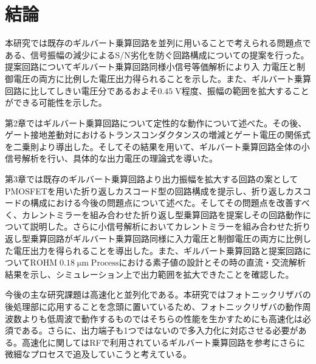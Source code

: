 \chapter{結論}

    本研究では既存のギルバート乗算回路を並列に用いることで考えられる問題点である、信号振幅の減少によるS/N劣化を防ぐ回路構成についての提案を行った。提案回路についてギルバート乗算回路同様小信号等価解析により入
    力電圧と制御電圧の両方に比例した電圧出力得られることを示した。また、ギルバート乗算回路に比してしきい電圧分であるおよそ$0.45\;\mathrm{V}$程度、振幅の範囲を拡大することができる可能性を示した。\par

    第2章ではギルバート乗算回路について定性的な動作について述べた。その後、ゲート接地差動対におけるトランスコンダクタンスの増減とゲート電圧の関係式を二乗則より導出した。そしてその結果を用いて、ギルバート乗算回路全体の小信号解析を行い、具体的な出力電圧の理論式を導いた。\par

    第3章では既存のギルバート乗算回路より出力振幅を拡大する回路の案としてPMOSFETを用いた折り返しカスコード型の回路構成を提示し、折り返しカスコードの構成における今後の問題点について述べた。そしてその問題点を改善すべく、カレントミラーを組み合わせた折り返し型乗算回路を提案しその回路動作について説明した。さらに小信号解析においてカレントミラーを組み合わせた折り返し型乗算回路がギルバート乗算回路同様に入力電圧と制御電圧の両方に比例した電圧出力を得られることを導出した。また、ギルバート乗算回路と提案回路について$\mathrm{ROHM\;0.18\;\mu m\;Process}$における素子値の設計とその時の直流・交流解析結果を示し、シミュレーション上で出力範囲を拡大できたことを確認した。\par

    今後の主な研究課題は高速化と並列化である。本研究ではフォトニックリザバの後処理部に応用することを念頭に置いているため、フォトニックリザバの動作周波数よりも低周波で動作するものではそちらの性能を生かすためにも高速化は必須である。さらに、出力端子も1つではないので多入力化に対応させる必要がある。高速化に関してはRFで利用されているギルバート乗算回路を参考にさらに微細なプロセスで追及していこうと考えている。